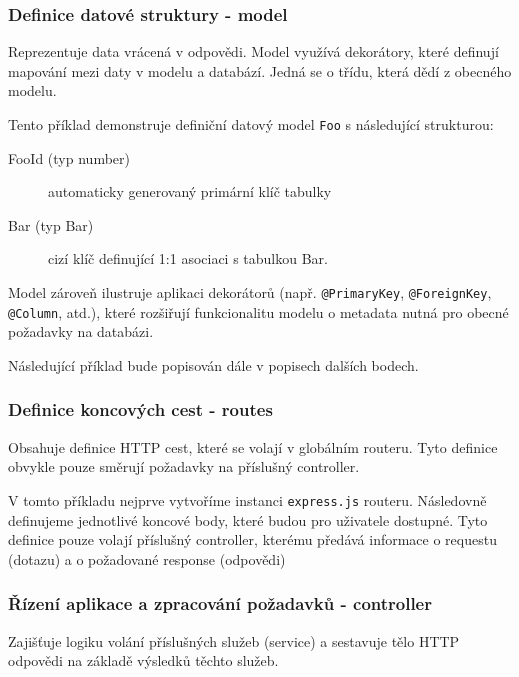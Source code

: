 \subsubsection{Definice datové struktury - model}
Reprezentuje data vrácená v odpovědi. Model využívá dekorátory, které definují mapování mezi daty v modelu a databází. Jedná se o třídu, která dědí z obecného modelu.



Tento příklad demonstruje definiční datový model \texttt{Foo} s následující strukturou:
\begin{description}
    \item[FooId (typ number)] automaticky generovaný primární klíč tabulky
    \item[Bar (typ Bar)] cizí klíč definující 1:1 asociaci s tabulkou Bar.
\end{description} 

Model zároveň ilustruje aplikaci dekorátorů (např. \texttt{@PrimaryKey}, \texttt{@ForeignKey}, \texttt{@Column}, atd.), které rozšiřují funkcionalitu modelu o metadata nutná pro obecné požadavky na databázi. 

Následující příklad bude popisován dále v popisech dalších bodech.
\subsubsection{Definice koncových cest - routes}
Obsahuje definice HTTP cest, které se volají v globálním routeru. Tyto definice obvykle pouze směrují požadavky na příslušný controller.



V tomto příkladu nejprve vytvoříme instanci \texttt{express.js} routeru. Následovně definujeme jednotlivé koncové body, které budou pro uživatele dostupné. Tyto definice pouze volají příslušný controller, kterému předává informace o requestu (dotazu) a o požadované response (odpovědi)

\subsubsection{Řízení aplikace a zpracování požadavků - controller} 
Zajišťuje logiku volání příslušných služeb (service) a sestavuje tělo HTTP odpovědi na základě výsledků těchto služeb.

